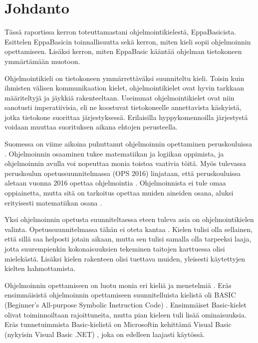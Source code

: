 
\section{Johdanto}
Tässä raportissa kerron toteuttamastani
ohjelmointikielestä, EppaBasicista.
Esittelen EppaBasicin toinnallisuutta
sekä kerron, miten kieli sopii
ohjelmoinnin opettamiseen.
Lisäksi kerron, miten EppaBasic
kääntää ohjelman tietokoneen
ymmärtämään muotoon.

Ohjelmointikieli on tietokoneen ymmärrettäväksi
suunniteltu kieli. Toisin kuin ihmisten välisen kommunikaation
kielet, ohjelmointikielet ovat hyvin tarkkaan määriteltyjä ja
jäykkiä rakenteeltaan. Useimmat ohjelmointikielet ovat niin
sanotusti imperatiivisia, eli ne koostuvat tietokoneelle
annettavista käskyistä, jotka tietokone suorittaa järjestyksessä.
Erilaisilla hyppykomennoilla järjestystä voidaan muuttaa suorituksen
aikana ehtojen perusteella.

Suomessa on viime aikoina
puhuttanut ohjelmoinnin
opettaminen peruskouluissa
\cite{hs_kiuru}\cite{hs_eka}.
Ohjelmoinnin osaaminen
tukee matematiikan ja logiikan
oppimista, ja ohjelmoinnin
avulla voi nopeuttaa monia
toistoa vaativia töitä.
Myös tulevassa peruskoulun
opetussuunnitelmassa (OPS 2016)
linjataan, että peruskouluissa aletaan
vuonna 2016 opettaa ohjelmointia
\cite{OPS_2016}.
Ohjelmoinnista ei tule omaa oppiainetta,
mutta sitä on tarkoitus opettaa muiden
aineiden osana, aluksi erityisesti
matematiikan osana \cite{OPS_2016}\cite{hs_eka}.

Yksi ohjelmoinnin opetusta suunniteltaessa eteen tuleva
asia on ohjelmointikielen valinta.
Opetussuunnitelmassa tähän ei
oteta kantaa \cite{hs_eka}.
Kielen tulisi olla sellainen,
että sillä saa helposti jotain aikaan,
mutta sen tulisi samalla olla tarpeeksi laaja,
jotta suurempienkin kokonaisuuksien tekeminen
taitojen karttuessa olisi mielekästä.
Lisäksi kielen rakenteen olisi tuettava muiden,
yleisesti käytettyjen kielten hahmottamista.

Ohjelmoinnin opettamiseen
on luotu monia eri kieliä ja menetelmiä
\cite{language_history}.
Eräs ensimmäisistä ohjelmoinnin opettamiseen
suunnitelluista kielistä oli BASIC
(Beginner's All-purpose Symbolic Instruction Code)
\cite{basic}.
Ensimmäiset Basic-kielet olivat toiminnoiltaan rajoittuneita,
mutta pian kieleen tuli lisää ominaisuuksia.
Eräs tunnetuimmista Basic-kielistä on
Microsoftin kehittämä Visual Basic
(nykyisin Visual Basic .NET)
\cite{vb.net},
joka on edelleen laajasti käytössä.


